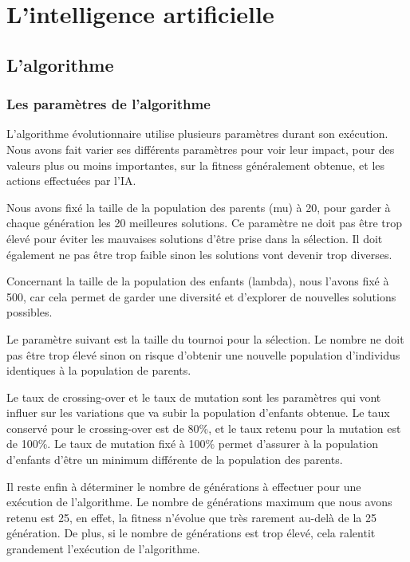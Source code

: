 \section{L'intelligence artificielle}

\subsection{L'algorithme}
	
	\subsubsection{Les paramètres de l'algorithme}
	
		L'algorithme évolutionnaire utilise plusieurs paramètres durant son exécution.
		Nous avons fait varier ses différents paramètres pour voir leur impact, pour des valeurs plus ou moins importantes,
		sur la fitness généralement obtenue, et les actions effectuées par l'IA.
		
		Nous avons fixé la taille de la population des parents (mu) à 20, pour garder à chaque génération les 20 meilleures
		solutions. Ce paramètre ne doit pas être trop élevé pour éviter les mauvaises solutions d'être prise dans la sélection.
		Il doit également ne pas être trop faible sinon les solutions vont devenir trop diverses.
		
		Concernant la taille de la population des enfants (lambda), nous l'avons fixé à 500, car cela permet de garder une diversité et d'explorer de nouvelles solutions possibles.
		
		Le paramètre suivant est la taille du tournoi pour la sélection. Le nombre ne doit pas être trop élevé sinon
		on risque d'obtenir une nouvelle population d'individus identiques à la population de parents.
		
		Le taux de crossing-over et le taux de mutation sont les paramètres qui vont influer sur les variations
		que va subir la population d'enfants obtenue. Le taux conservé pour le crossing-over est de 80\%, et le taux
		retenu pour la mutation est de 100\%. Le taux de mutation fixé à 100\% permet d'assurer à la population d'enfants
		d'être un minimum différente de la population des parents.
		
		Il reste enfin à déterminer le nombre de générations à effectuer pour une exécution de l'algorithme.
		Le nombre de générations maximum que nous avons retenu est 25, en effet, la fitness n'évolue que très 
		rarement au-delà de la 25\ieme{} génération. De plus, si le nombre de générations est trop élevé, cela
		ralentit grandement l'exécution de l'algorithme.
	
